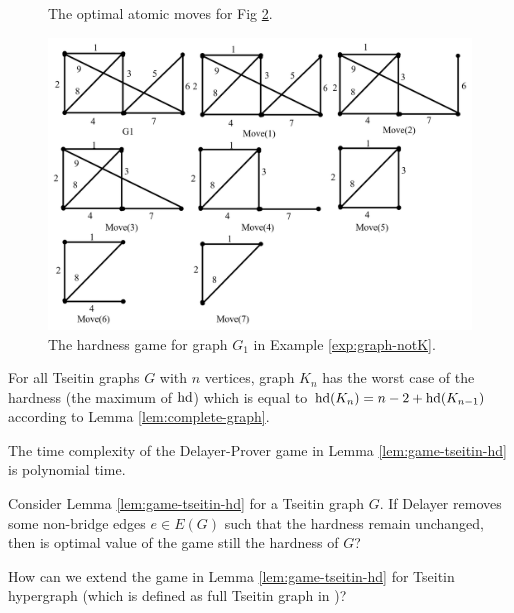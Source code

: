 \documentclass{report}
\begin{document}
\begin{examp}
\begin{figure}[h]
\begin{tabular}{|c|c|}
   \end{tabular}
   \caption{The optimal atomic moves for Fig \ref{fig:hd4}.} \label{fig:game4}
   \end{figure}
   \begin{figure}
   \begin{center}
   \includegraphics[scale =0.4]{graph_hd1.png}
   \caption{The hardness game for graph $G_1$ in Example \ref{exp:graph-notK}.}  \label{fig:hd4}
   \end{center}
   \end{figure}
\end{examp}
  
\begin{conj}\label{con:hd_game2}
For all Tseitin graphs $G$ with $n$ vertices, graph $K_n$ has the worst case of the hardness (the maximum of $\operatorname{hd}$) which is equal to $\operatorname{hd}(K_n)= n-2+\operatorname{hd}(K_{n-1})$ according to Lemma \ref{lem:complete-graph}.
\end{conj}

\begin{conj}\label{con:hd-game-time}
The time complexity of the Delayer-Prover game in Lemma \ref{lem:game-tseitin-hd} is polynomial time.
\end{conj}

\begin{quest}\label{que:gamehd-move}
Consider Lemma \ref{lem:game-tseitin-hd} for a Tseitin graph $G$. If Delayer removes some non-bridge edges $e \in E(G)$ such that the hardness remain unchanged, then is optimal value of the game still the hardness of $G$?
\end{quest}

\begin{quest}\label{que:gamehd}
How can we extend the game in Lemma \ref{lem:game-tseitin-hd} for Tseitin hypergraph (which is defined as full Tseitin graph in \cite{BeyersdorffGwynneKullmann2013PHPER})?
\end{quest}
\end{document}
